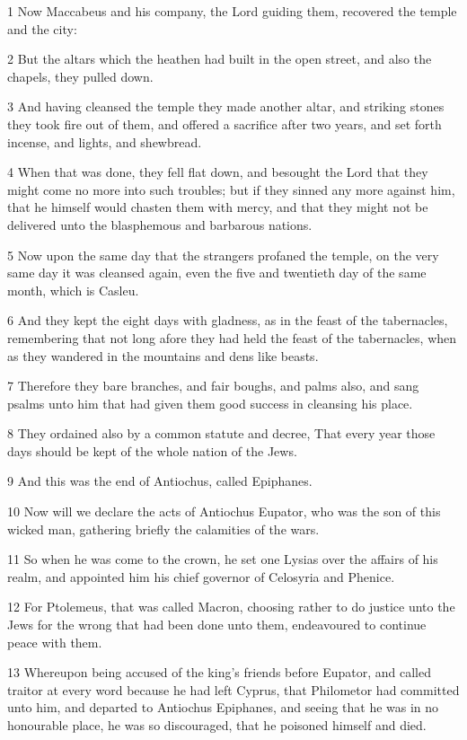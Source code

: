 \par 1 Now Maccabeus and his company, the Lord guiding them, recovered the temple and the city:
\par 2 But the altars which the heathen had built in the open street, and also the chapels, they pulled down.
\par 3 And having cleansed the temple they made another altar, and striking stones they took fire out of them, and offered a sacrifice after two years, and set forth incense, and lights, and shewbread.
\par 4 When that was done, they fell flat down, and besought the Lord that they might come no more into such troubles; but if they sinned any more against him, that he himself would chasten them with mercy, and that they might not be delivered unto the blasphemous and barbarous nations.
\par 5 Now upon the same day that the strangers profaned the temple, on the very same day it was cleansed again, even the five and twentieth day of the same month, which is Casleu.
\par 6 And they kept the eight days with gladness, as in the feast of the tabernacles, remembering that not long afore they had held the feast of the tabernacles, when as they wandered in the mountains and dens like beasts.
\par 7 Therefore they bare branches, and fair boughs, and palms also, and sang psalms unto him that had given them good success in cleansing his place.
\par 8 They ordained also by a common statute and decree, That every year those days should be kept of the whole nation of the Jews.
\par 9 And this was the end of Antiochus, called Epiphanes.
\par 10 Now will we declare the acts of Antiochus Eupator, who was the son of this wicked man, gathering briefly the calamities of the wars.
\par 11 So when he was come to the crown, he set one Lysias over the affairs of his realm, and appointed him his chief governor of Celosyria and Phenice.
\par 12 For Ptolemeus, that was called Macron, choosing rather to do justice unto the Jews for the wrong that had been done unto them, endeavoured to continue peace with them.
\par 13 Whereupon being accused of the king's friends before Eupator, and called traitor at every word because he had left Cyprus, that Philometor had committed unto him, and departed to Antiochus Epiphanes, and seeing that he was in no honourable place, he was so discouraged, that he poisoned himself and died.

